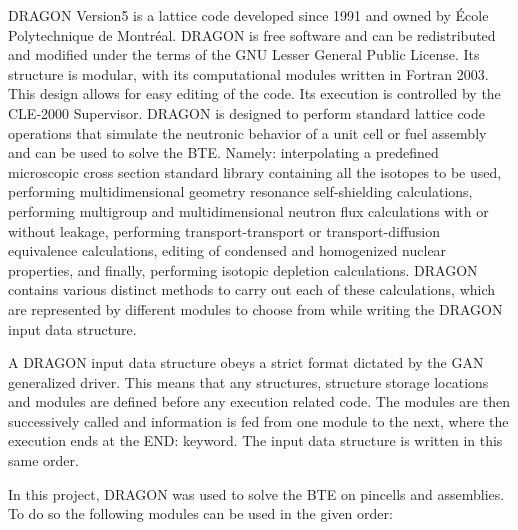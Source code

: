 \documentclass[12pt]{article}
\begin{document}
 DRAGON Version5 \cite{hebert2016dragon5}\cite{marleau2011user} is a lattice code developed since 1991 and owned by École Polytechnique de Montréal. DRAGON is free software and can be redistributed and modified under the terms of the GNU Lesser General Public License. Its structure is modular, with its computational modules written in Fortran 2003. This design allows for easy editing of the code. Its execution is controlled by the CLE-2000 Supervisor. DRAGON is designed to perform standard lattice code  operations that simulate the neutronic behavior of a unit cell or fuel assembly and can be used to solve the BTE. Namely: interpolating a predefined microscopic cross section standard library containing all the isotopes to be used, performing multidimensional geometry resonance self-shielding calculations, performing multigroup and multidimensional neutron flux calculations with or without leakage, performing transport-transport or transport-diffusion equivalence calculations, editing of condensed and homogenized nuclear properties, and finally, performing isotopic depletion calculations. DRAGON contains various distinct methods to carry out each of these calculations, which are represented by different modules to choose from while writing the DRAGON input data structure. 

A DRAGON input data structure obeys a strict format dictated by the GAN generalized driver. This means that any structures, structure storage locations and modules   are defined before any execution related code.  The modules are then successively called and information is fed from one module to the next, where the execution ends at the END: keyword. The input data structure is written in this same order. 

In this project, DRAGON was used to solve the BTE on pincells and assemblies. To do so the following modules can be used in the given order:
 
\end{document}

